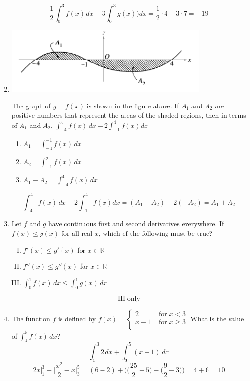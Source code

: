 \documentclass[12pt]{article}
\begin{document}
\begin{enumerate}
$$\frac{1}{2}\int^{3}_{0}f(x) \, dx -3 \int_{0}^{3} g(x))dx = \frac{1}{2} \cdot 4 - 3 \cdot 7 = \boxed{-19}$$

\item 
\begin{center}
    \includegraphics[width=4in]{original-9.png}
\end{center}
The graph of $y=f(x)$ is shown in the figure above. If $A_1$ and $A_2$ are positive numbers that represent the areas of the shaded regions, then in terms of $A_1$ and $A_2$, $\int_{-4}^{4} f(x) \, dx -2 \int_{-1}^{4} f(x) dx=$
\begin{enumerate}
    \item $A_1 = \int_{-4}^{-1} f(x) \, dx$
    \item $A_2 = \int_{-1}^{2} f(x) \, dx$
    \item $A_1-A_2 = \int_{-4}^{4} f(x) \, dx$
\end{enumerate}
$$\int_{-4}^{4} f(x) \, dx -2 \int_{-1}^{4} f(x) dx= (A_1-A_2) - 2(-A_2) = \boxed{A_1+A_2}$$
\newpage
\item Let $f$ and $g$ have continuous first and second derivatives everywhere. If $f(x)\leq g(x)$ for all real $x$, which of the following must be true?
\begin{enumerate}[I.]
    \item $f'(x) \leq g'(x)$ for $x \in \mathbb{R}$ 
    \item $f''(x) \leq g''(x)$ for $x \in \mathbb{R}$
    \item $\int_{0}^{1} f(x) \,dx \leq \int_{0}^{1} g(x) \, dx$
\end{enumerate}
$$\boxed{\text{III only}}$$
\item The function $f$ is defined by $f(x)=\left\{
\begin{array}{ll}
     2 & \text{ for } x <3 \\
      x-1 & \text{ for } x \geq3 \\
\end{array} \right.$ What is the value of $\int_1^5 f(x)\,dx$?
$$\int_{1}^{3} 2 \, dx + \int_{3}^{5} (x-1) \, dx$$
$$2x \biggr\rvert_{1}^{3}  + \biggr[\frac{x^2}{2}-x\biggr]_{3}^{5} = (6-2)+ \biggr(\biggr( \frac{25}{2}-5  \biggr)- \biggr( \frac{9}{2}-3 \biggr)\biggr) = 4+6=\boxed{10}$$



\end{enumerate}
\end{document}
